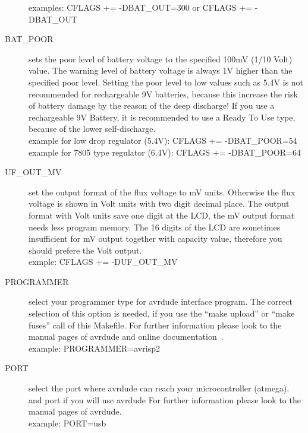\begin{description}
examples: CFLAGS += -DBAT\_OUT=300  or CFLAGS += -DBAT\_OUT
  \item[BAT\_POOR] sets the poor level of battery voltage to the specified 100mV (1/10 Volt) value.
The warning level of battery voltage is always 1V higher than the specified poor level.
Setting the poor level to low values such as 5.4V is not recommended for rechargeable 9V batteries,
because this increase the risk of battery damage by the reason of the deep discharge!
If you use a rechargeable 9V Battery, it is recommended to use a Ready To Use type, because of the lower self-discharge.\\
example for low drop regulator (5.4V): CFLAGS += -DBAT\_POOR=54
example for 7805 type regulator (6.4V): CFLAGS += -DBAT\_POOR=64
  \item[UF\_OUT\_MV] set the output format of the flux voltage to mV units.
Otherwise the flux voltage is shown in Volt units with two digit decimal place.
The output format with Volt units save one digit at the LCD, the mV output format needs less program memory.
The 16 digits of the LCD are sometimes insufficient for mV output together with capacity value, therefore you should prefere the Volt output.\\
exmple: CFLAGS += -DUF\_OUT\_MV
  \item[PROGRAMMER] select your programmer type for avrdude interface program.
The correct selection of this option is needed, if you use the ``make upload'' or ``make fuses'' call
of this Makefile.
For further information please look to the manual pages of avrdude and online documentation~\cite{avrdude}.\\
example: PROGRAMMER=avrisp2
  \item[PORT] select the port where avrdude can reach your microcontroller (atmega).
and port if you will use avrdude
For further information please look to the manual pages of avrdude.\\
example: PORT=usb

\end{description}

